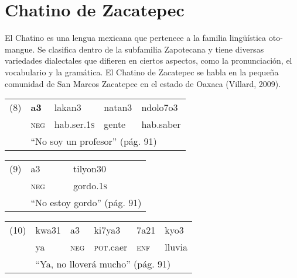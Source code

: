 \section*{Chatino de Zacatepec}

\noindent El Chatino es una lengua mexicana que pertenece a la familia lingüística oto-mangue. Se clasifica dentro de la subfamilia Zapotecana y tiene diversas variedades dialectales que difieren en ciertos aspectos, como la pronunciación, el vocabulario y la gramática. El Chatino de Zacatepec se habla en la pequeña comunidad de San Marcos Zacatepec en el estado de Oaxaca (Villard, 2009). \vspace{1cm}

{\setmainfont{Doulos SIL}
    \begin{tabular}{rllll}
        \multicolumn{1}{l}{(8)} & \textbf{a3}                                        & lakan3              & natan3 & ndolo7o3  \\
                                & \textsc{neg}                                       & hab.ser.\textsc{1s} & gente  & hab.saber \\
                                & \multicolumn{4}{l}{“No soy un profesor” (pág. 91)}                                            \\
    \end{tabular}
    \vspace{0.5cm}

    \begin{tabular}{rll}
        \multicolumn{1}{l}{(9)} & a3                                             & tilyon30          \\
                                & \textsc{neg}                                   & gordo.\textsc{1s} \\
                                & \multicolumn{2}{l}{“No estoy gordo” (pág. 91)}                     \\
    \end{tabular}
    \vspace{0.5cm}

    \begin{tabular}{rlllll}
        \multicolumn{1}{l}{(10)} & kwa31                                                & a3           & ki7ya3            & 7a21         & kyo3   \\
                                 & ya                                                   & \textsc{neg} & \textsc{pot}.caer & \textsc{enf} & lluvia \\
                                 & \multicolumn{5}{l}{“Ya, no lloverá mucho” (pág. 91)}                                                            \\
    \end{tabular}
} \vspace{1cm}

